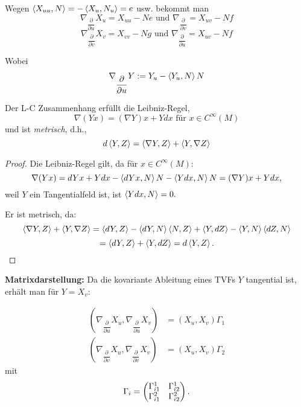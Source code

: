\begin{remark}
	
	Wegen $ \left \langle X_{uu},N \right\rangle= -\left \langle X_u,N_u \right\rangle= e $ usw. bekommt man 
		\[ \nabla_{\dfrac{\partial}{\partial u}}X_u = X_{uu}-Ne \text{ und } \nabla_{\dfrac{\partial}{\partial v}} = X_{uv}-Nf \]
		\[ \nabla_{\dfrac{\partial}{\partial v}}X_v = X_{vv}-Ng \text{ und } \nabla_{\dfrac{\partial}{\partial u}} = X_{uv}-Nf \]
	
	Wobei $$ \nabla_{\dfrac{\partial}{\partial u}}Y := Y_u - \left \langle Y_u,N \right\rangle N $$
	
\end{remark}

\begin{lemma}
	
	Der L-C Zusammenhang erfüllt die Leibniz-Regel,
		\[ \nabla(Yx) = (\nabla Y)x + Ydx \text{ für } x \in C^\infty(M) \] 
	und ist \emph{metrisch}, d.h., 
		\[ d\left \langle Y,Z \right\rangle = \left \langle \nabla Y,Z \right\rangle + \left \langle Y,\nabla Z \right\rangle \]
	
\end{lemma}

\begin{proof}
	
	Die Leibniz-Regel gilt, da für $x \in C^\infty(M)$:
		\[ \nabla(Yx) = dYx + Ydx- \left \langle dYx,N \right\rangle N - \left \langle Ydx,N \right\rangle N = (\nabla Y)x + Ydx, \]
	weil $ Y $ ein Tangentialfeld ist, ist $ \left \langle Ydx,N \right\rangle = 0. $ 
	
	Er ist metrisch, da:
		\[  \left \langle \nabla Y,Z \right\rangle + \left \langle Y,\nabla Z \right\rangle = \left \langle dY,Z \right\rangle -\left \langle dY,N \right\rangle\left \langle N,Z \right\rangle + \left \langle Y,dZ \right\rangle - \left \langle Y,N \right\rangle\left \langle dZ,N \right\rangle \]
		\[ = \left \langle dY,Z \right\rangle + \left \langle Y,dZ \right\rangle = d\left \langle Y,Z \right\rangle. \]
	
\end{proof}

\textbf{Matrixdarstellung:} Da die kovariante Ableitung eines TVFs $ Y $ tangential ist, erhält man für $ Y = X_v :$

\begin{equation} \label{Eq:Gamma}
\begin{split}
		 \left(\nabla_{\dfrac{\partial}{\partial u}}X_u,\nabla_{\dfrac{\partial}{\partial u}}X_v \right) &= (X_u,X_v)\Gamma_1  \\
		 \left(\nabla_{\dfrac{\partial}{\partial v}}X_u,\nabla_{\dfrac{\partial}{\partial v}}X_v \right) &= (X_u,X_v)\Gamma_2 
\end{split}
\end{equation} 
	mit 
		\[ \Gamma_i = \begin{pmatrix} \Gamma_{i1}^1 & \Gamma_{i2}^1 \\ \Gamma_{i1}^2 & \Gamma_{i2}^2 \end{pmatrix}. \]
		
